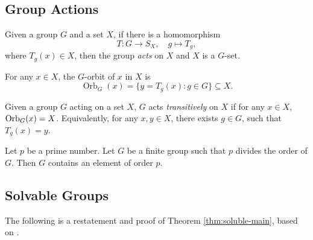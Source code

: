 \subsection{Group Actions}



\begin{definition} \label{def:action}
	Given a group $G$ and a set $X$, if there is a homomorphism
	$$
	T: G \rightarrow S_X, \quad g \mapsto T_g,
	$$
	where $T_g(x) \in X$, then the group \textit{acts} on $X$ and $X$ is a $G$-set. 
\end{definition}

\begin{definition}
	For any $x \in X$, the $G$-orbit of $x$ in $X$ is
	$$\operatorname{Orb}_G(x) = \{ y = T_g(x) : g \in G \} \subseteq X.$$

	
\end{definition}

\begin{definition} \label{def:transitive-action}
	Given a group $G$ acting on a set $X$, $G$ acts \textit{transitively} on $X$ if for any $x \in X$, $\operatorname{Orb}_G(x) = X$. Equivalently, for any $x, y\in X$, there exists $g \in G$, such that $T_g(x) = y$. 
\end{definition}

\begin{theorem} \label{thm:cauchy}
	Let $p$ be a prime number. Let $G$ be a finite group such that $p$ divides the order of $G$. Then $G$ contains an element of order $p$. 
\end{theorem}

\subsection{Solvable Groups}

The following is a restatement and proof of Theorem \ref{thm:soluble-main}, based on \cite[Chapter~14]{Stewart}.

